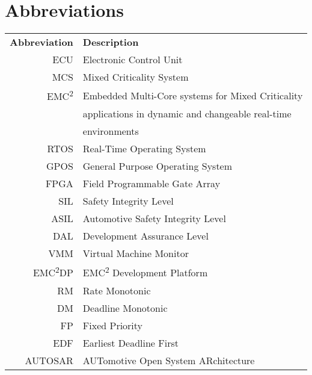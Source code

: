 \chapter*{Abbreviations}
\begin{tabular}{r l}
\textbf{Abbreviation} 	& \textbf{Description} \vspace{.5em} \\
ECU		&Electronic Control Unit\\
MCS		&Mixed Criticality System\\
EMC\textsuperscript{2}	&Embedded Multi-Core systems for Mixed Criticality\\
 		&applications in dynamic and changeable real-time\\
 		&environments\\
RTOS	&Real-Time Operating System\\
GPOS	&General Purpose Operating System\\
FPGA	&Field Programmable Gate Array\\
SIL		&Safety Integrity Level\\
ASIL	&Automotive Safety Integrity Level\\
DAL		&Development Assurance Level\\
VMM		&Virtual Machine Monitor\\
EMC\textsuperscript{2}DP	&EMC\textsuperscript{2} Development Platform\\
RM		&Rate Monotonic\\
DM		&Deadline Monotonic\\
FP		&Fixed Priority\\
EDF		&Earliest Deadline First\\
AUTOSAR	&AUTomotive Open System ARchitecture\\

\end{tabular}